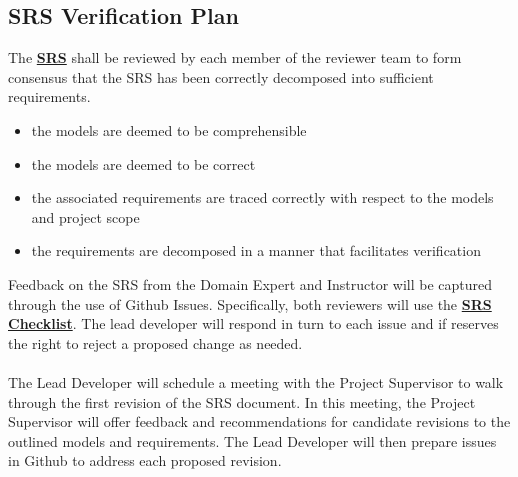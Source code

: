 \documentclass[12pt, titlepage]{article}
\begin{document}
\subsection{SRS Verification Plan}
The \textbf{\href{https://github.com/KiranSingh15/CAS-741-Image-Correspondences/blob/main/docs/SRS/SRS.pdf}
{SRS}} shall be reviewed by each member of the reviewer team to form consensus that the SRS has been correctly 
decomposed into sufficient requirements.\\
\begin{itemize}
\item the models are deemed to be comprehensible
\item the models are deemed to be correct
\item the associated requirements are traced correctly with respect to the models 
and project scope 
\item the requirements are decomposed in a manner that facilitates verification
\end{itemize}
Feedback on the SRS from the Domain Expert and Instructor will be captured through 
the use of Github Issues. Specifically, both reviewers will use the 
\textbf{\href{https://github.com/KiranSingh15/CAS-741-Image-Correspondences/blob/
main/docs/Checklists/SRS-Checklist.pdf}
{SRS Checklist}}. 
The lead developer will respond in turn to each issue and if 
reserves the right to reject a proposed change as needed. \\ \\
The Lead Developer will schedule a meeting with the Project Supervisor to walk through 
the first revision of the SRS document. In this meeting, the Project Supervisor will offer 
feedback and recommendations for candidate revisions to the outlined models and requirements. 
The Lead Developer will then prepare issues in Github to address each proposed revision. \\ \\
\end{document}
